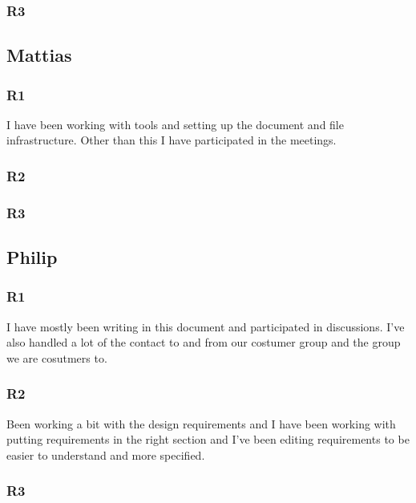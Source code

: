 \documentclass[a4paper]{article}
\begin{document}
    \subsubsection{R3}
  
  \subsection{Mattias}
    \subsubsection{R1}
    I have been working with tools and setting up the document and file infrastructure. Other than this I have participated in the meetings.
    \subsubsection{R2}
    \subsubsection{R3}
  \subsection{Philip}
    \subsubsection{R1}
  I have mostly been writing in this document and participated in discussions. I've also handled a lot of the contact to and from our costumer group and the group we are cosutmers to.
    \subsubsection{R2}
    Been working a bit with the design requirements and I have been working with putting requirements in the right section and I've been editing requirements to be easier to understand and more specified. 
    \subsubsection{R3}
\end{document}
